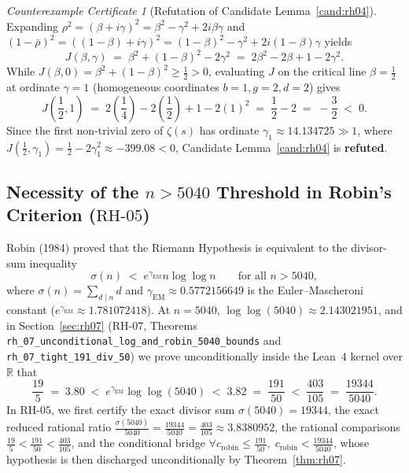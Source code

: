 \documentclass[11pt,a4paper]{article}
\theoremstyle{plain}
\theoremstyle{definition}
\theoremstyle{remark}
\newtheorem{counterexample}[theorem]{Counterexample Certificate}
\newcommand{\R}{\mathbb{R}}
\begin{document}
\begin{counterexample}[Refutation of Candidate Lemma~\ref{cand:rh04}]
Expanding $\rho^2 = (\beta + i\gamma)^2 = \beta^2 - \gamma^2 + 2i\beta\gamma$ and $(1 - \bar{\rho})^2 = ((1-\beta) + i\gamma)^2 = (1-\beta)^2 - \gamma^2 + 2i(1-\beta)\gamma$ yields
\[
  J(\beta, \gamma) \;=\; \beta^2 + (1-\beta)^2 - 2\gamma^2 \;=\; 2\beta^2 - 2\beta + 1 - 2\gamma^2.
\]
While $J(\beta, 0) = \beta^2 + (1-\beta)^2 \ge \frac{1}{2} > 0$, evaluating $J$ on the critical line $\beta = \frac{1}{2}$ at ordinate $\gamma = 1$ (homogeneous coordinates $b = 1, g = 2, d = 2$) gives
\[
  J\!\left(\frac{1}{2}, 1\right) \;=\; 2\left(\frac{1}{4}\right) - 2\left(\frac{1}{2}\right) + 1 - 2(1)^2 \;=\; \frac{1}{2} - 2 \;=\; -\frac{3}{2} \;<\; 0.
\]
Since the first non-trivial zero of $\zeta(s)$ has ordinate $\gamma_1 \approx 14.134725 \gg 1$, where $J(\frac{1}{2}, \gamma_1) = \frac{1}{2} - 2\gamma_1^2 \approx -399.08 < 0$, Candidate Lemma~\ref{cand:rh04} is \textbf{refuted}.
\end{counterexample}

\subsection{Necessity of the \texorpdfstring{$n > 5040$}{n > 5040} Threshold in Robin's Criterion (\texorpdfstring{$\mathrm{RH\text{-}05}$}{RH-05})}

Robin (1984) proved that the Riemann Hypothesis is equivalent to the divisor-sum inequality
\begin{equation}\label{eq:robin}
  \sigma(n) \;<\; e^{\gamma_{\mathrm{EM}}} n \log\log n \qquad \text{for all } n > 5040,
\end{equation}
where $\sigma(n) = \sum_{d \mid n} d$ and $\gamma_{\mathrm{EM}} \approx 0.5772156649$ is the Euler--Mascheroni constant ($e^{\gamma_{\mathrm{EM}}} \approx 1.781072418$). At $n = 5040$, $\log\log(5040) \approx 2.143021951$, and in Section~\ref{sec:rh07} ($\mathrm{RH\text{-}07}$, Theorems \texttt{rh\_07\_unconditional\_log\_and\_robin\_5040\_bounds} and \texttt{rh\_07\_tight\_191\_div\_50}) we prove unconditionally inside the Lean~4 kernel over $\R$ that
\[
  \frac{19}{5} \;=\; 3.80 \;<\; e^{\gamma_{\mathrm{EM}}}\log\log(5040) \;<\; 3.82 \;=\; \frac{191}{50} \;<\; \frac{403}{105} \;=\; \frac{19344}{5040}.
\]
In $\mathrm{RH\text{-}05}$, we first certify the exact divisor sum $\sigma(5040) = 19344$, the exact reduced rational ratio $\frac{\sigma(5040)}{5040} = \frac{19344}{5040} = \frac{403}{105} \approx 3.8380952$, the rational comparisons $\frac{19}{5} < \frac{191}{50} < \frac{403}{105}$, and the conditional bridge $\forall c_{\mathrm{robin}} \le \frac{191}{50},\; c_{\mathrm{robin}} < \frac{19344}{5040}$, whose hypothesis is then discharged unconditionally by Theorem~\ref{thm:rh07}.
\end{document}
